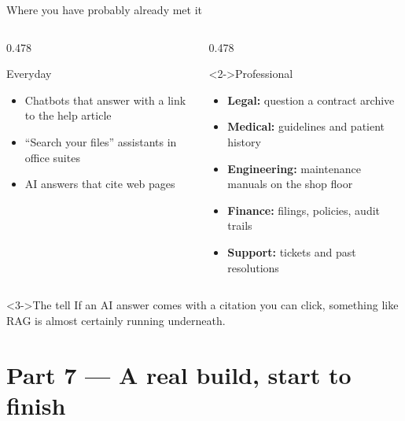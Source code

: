 \documentclass[aspectratio=169,11pt]{beamer}
\begin{document}
\begin{frame}{Where you have probably already met it}
  \begin{columns}[T,onlytextwidth]
    \begin{column}{0.478\textwidth}
      \begin{block}{Everyday}
        \begin{itemize}
          \item Chatbots that answer with a link to the help article
          \item ``Search your files'' assistants in office suites
          \item AI answers that cite web pages
        \end{itemize}
      \end{block}
    \end{column}
    \begin{column}{0.478\textwidth}
      \begin{block}<2->{Professional}
        \begin{itemize}
          \item \textbf{Legal:} question a contract archive
          \item \textbf{Medical:} guidelines and patient history
          \item \textbf{Engineering:} maintenance manuals on the shop floor
          \item \textbf{Finance:} filings, policies, audit trails
          \item \textbf{Support:} tickets and past resolutions
        \end{itemize}
      \end{block}
    \end{column}
  \end{columns}
  \medskip
  \begin{exampleblock}<3->{The tell}
    If an AI answer comes with a citation you can click, something like RAG is
    almost certainly running underneath.
  \end{exampleblock}
\end{frame}

\section{Part 7 --- A real build, start to finish}
\end{document}
